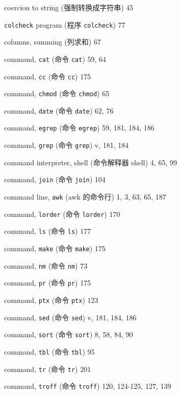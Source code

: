 \begin{multicols}{3}
\hangindent=3pc  coercion to string (强制转换成字符串) 45

\hangindent=3pc  \verb'colcheck' program (程序 \verb'colcheck') 77

\hangindent=3pc  columns, summing (列求和) 67

\hangindent=3pc  command, \verb'cat' (命令 \verb'cat') 59, 64

\hangindent=3pc  command, \verb'cc' (命令 \verb'cc') 175

\hangindent=3pc  command, \verb'chmod' (命令 \verb'chmod') 65

\hangindent=3pc  command, \verb'date' (命令 \verb'date') 62, 76

\hangindent=3pc  command, \verb'egrep' (命令 \verb'egrep')
59, 181, 184,  186

\hangindent=3pc  command, \verb'grep' (命令 \verb'grep') v, 181, 184

\hangindent=3pc  command interpreter, shell (命令解释器 shell)
4, 65,  99

\hangindent=3pc  command, \verb'join' (命令 \verb'join') 104

\hangindent=3pc  command line, \verb'awk' (awk 的命令行) 1, 3, 63, 65, 187

\hangindent=3pc  command, \verb'lorder' (命令 \verb'lorder') 170

\hangindent=3pc  command, \verb'ls' (命令 \verb'ls') 177

\hangindent=3pc  command, \verb'make' (命令 \verb'make') 175

\hangindent=3pc  command, \verb'nm' (命令 \verb'nm') 73

\hangindent=3pc  command, \verb'pr' (命令 \verb'pr') 175

\hangindent=3pc  command, \verb'ptx' (命令 \verb'ptx') 123

\hangindent=3pc  command, \verb'sed' (命令 \verb'sed') 
v, 181, 184, 186

\hangindent=3pc  command, \verb'sort' (命令 \verb'sort') 8, 58, 84, 90

\hangindent=3pc  command, \verb'tbl' (命令 \verb'tbl') 95

\hangindent=3pc  command, \verb'tr' (命令 \verb'tr') 201

\hangindent=3pc  command, \verb'troff' (命令 \verb'troff')
120, 124-125, 127, 139


\end{multicols}
